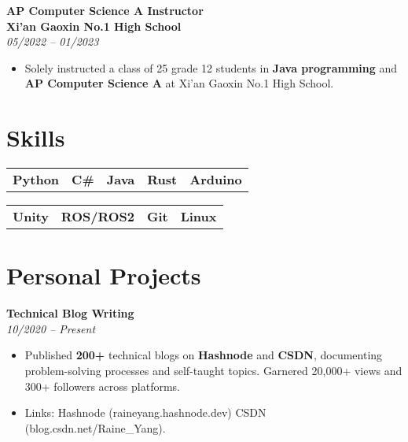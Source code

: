 \documentclass[a4paper,10pt]{article}
\begin{document}
\begin{multicols}{2}
\vspace{0.25cm}

\noindent
\textbf{\large{AP Computer Science A Instructor}} \\
\textbf{Xi'an Gaoxin No.1 High School} \\
\textit{05/2022 -- 01/2023} \\
\begin{itemize}
    \item Solely instructed a class of 25 grade 12 students in \textbf{Java programming} and \textbf{AP Computer Science A} at Xi’an Gaoxin No.1 High School.
\end{itemize}

\columnbreak

\section*{\color{NavyBlue}Skills}
\noindent
\begin{tabular}{l|l|l|l|l}
\textbf{Python} & \textbf{C\#} & \textbf{Java} & \textbf{Rust} & \textbf{Arduino} \\
\end{tabular}

\vspace{0.3cm}

\noindent
\begin{tabular}{l|l|l|l}
\textbf{Unity} & \textbf{ROS/ROS2} & \textbf{Git} & \textbf{Linux} \\
\end{tabular}

\section*{\color{NavyBlue}Personal Projects}
\noindent
\textbf{Technical Blog Writing} \hfill \\
\textit{10/2020 -- Present} \\
\begin{itemize}
    \item Published \textbf{200+} technical blogs on \textbf{Hashnode} and \textbf{CSDN}, documenting problem-solving processes and self-taught topics. Garnered 20,000+ views and 300+ followers across platforms.
    \item Links: Hashnode (raineyang.hashnode.dev) CSDN (blog.csdn.net/Raine\_Yang).
\end{itemize}

\vspace{0.25cm}


\end{multicols}
\end{document}
